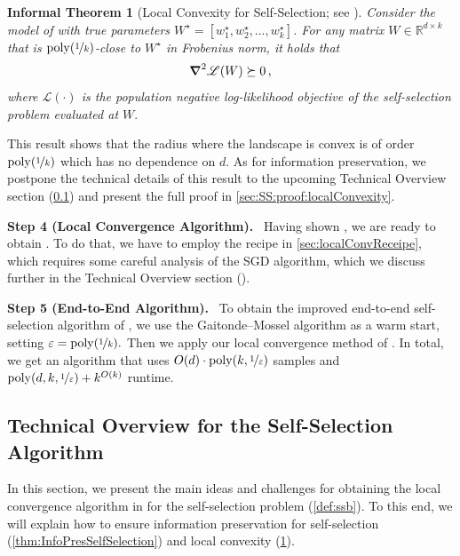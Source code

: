 \documentclass[11pt,letterpaper]{article}
\theoremstyle{plain}
\newtheorem{inftheorem}{Informal Theorem}
\theoremstyle{definition}
\theoremstyle{remark}
\newcommand{\R}{\mathbb{R}}
\newcommand{\nfrac}[2]{\nicefrac{#1}{#2}}
\newcommand{\poly}{\mathrm{poly}}
\newcommand{\eps}{\varepsilon}
\newcommand{\customcal}[1]{\euscr{#1}}
\newcommand{\cL}{\customcal{L}}
\renewcommand{\paragraph}[1]{\medskip \noindent\textbf{#1}~}
\newcommand{\negLL}{\ensuremath{\mathscr{L}}}
\newcommand{\Wstar}{{W^\star}}
\renewcommand{\cL}{\negLL}
\begin{document}
\begin{inftheorem}
[Local Convexity for Self-Selection; see ]
Consider the model of  with true parameters $W^\star = [w_1^\star,w_2^\star,\dots,w_k^\star]$.
For any matrix $W\in \R^{d\times k}$ that is $\poly(\nfrac{1}{k})$-close to $\Wstar$ in Frobenius norm, it holds that
                    \[
                        \grad^2 \cL(W) \succeq 0\,,
                    \]
where $\cL(\cdot)$ is the population negative log-likelihood objective of the self-selection problem evaluated at $W.$
\label{thm:LocalConvSelfSelection}
\end{inftheorem}
This result shows that the radius where the landscape is convex is of order $\poly(\nfrac{1}{k})$ {which} has no dependence on $d$.
As for information preservation, we postpone the technical details of this result to the upcoming Technical Overview section (\cref{sec:Overview}) and present the full proof in \cref{sec:SS:proof:localConvexity}.

\paragraph{Step 4 (Local Convergence Algorithm).}
Having shown
, we are ready to obtain . To do that, we have to employ the recipe in \cref{sec:localConvReceipe}, which requires some careful analysis of the SGD algorithm, which we discuss further in the {Technical Overview} section ().

\paragraph{Step 5 (End-to-End Algorithm).} To obtain the improved end-to-end self-selection algorithm of , we use the Gaitonde--Mossel algorithm \cite{gaitonde2024selfselection} as a warm start, setting $\eps = \poly(\nfrac{1}{k}).$ Then we apply our local convergence method of . In total, we get an algorithm that uses $O(d)\cdot  \poly(k,\nfrac{1}{\eps})$ samples and $\poly(d,k,\nfrac{1}{\eps}) + k^{O(k)}$ runtime.

\subsection{Technical Overview for the Self-Selection Algorithm}
\label{sec:Overview}
    In this section, we present the main ideas and challenges for obtaining the local convergence algorithm in  for the self-selection problem (\cref{def:ssb}). To this end, we will explain how to ensure information preservation for self-selection (\cref{thm:InfoPresSelfSelection}) and local convexity (\cref{thm:LocalConvSelfSelection}).
\end{document}
